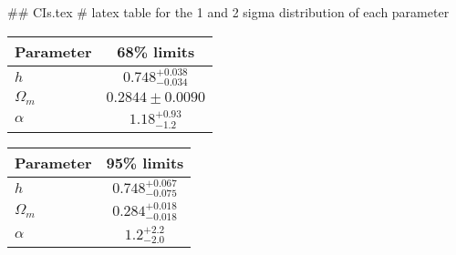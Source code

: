 ## CIs.tex
# latex table for the 1 and 2 sigma distribution of each parameter

\begin{tabular} { l  c}
 Parameter &  68\% limits\\
\hline
{\boldmath$h              $} & $0.748^{+0.038}_{-0.034}   $\\
{\boldmath$\Omega_m       $} & $0.2844\pm 0.0090          $\\
{\boldmath$\alpha         $} & $1.18^{+0.93}_{-1.2}       $\\
\hline
\end{tabular}

\begin{tabular} { l  c}
 Parameter &  95\% limits\\
\hline
{\boldmath$h              $} & $0.748^{+0.067}_{-0.075}   $\\
{\boldmath$\Omega_m       $} & $0.284^{+0.018}_{-0.018}   $\\
{\boldmath$\alpha         $} & $1.2^{+2.2}_{-2.0}         $\\
\hline
\end{tabular}
